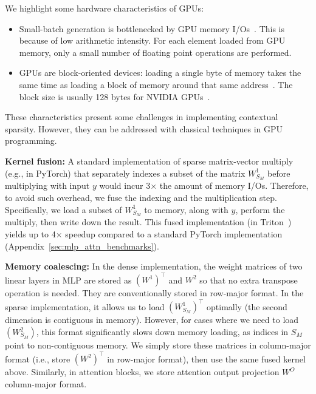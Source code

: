 We highlight some hardware characteristics of GPUs:
\begin{itemize}[itemsep=0.0pt,topsep=0pt,leftmargin=*]
  \item Small-batch generation is bottlenecked by GPU memory I/Os~\citep{nvidia2022nvidia, ivanov2021data, dao2022flashattention}. This is
  because of low arithmetic intensity. For each element loaded from GPU memory,
  only a small number of floating point operations are performed.
  \item GPUs are block-oriented devices: loading a single byte of memory takes
  the same time as loading a block of memory around that same
  address~\cite{harris2013access}. The block size is
  usually 128 bytes for NVIDIA GPUs~\citep{cook2012cuda}.
\end{itemize}
These characteristics present some challenges in implementing contextual
sparsity.
However, they can be addressed with classical techniques in GPU programming.

\textbf{Kernel fusion:} A standard implementation of sparse matrix-vector
  multiply (e.g., in PyTorch) that separately indexes a subset of the matrix
  $W^1_{S_M}$ before multiplying with input $y$ would incur 3$\times$ the
  amount of memory I/Os. Therefore, to avoid such overhead, we fuse the indexing and the multiplication step. Specifically, we load a subset of
  $W^1_{S_M}$ to memory, along with $y$, perform the multiply, then
  write down the result.
  This fused implementation (in Triton~\citep{tillet2019triton}) yields up to
  4$\times$ speedup compared to a standard PyTorch implementation (Appendix~\ref{sec:mlp_attn_benchmarks}).
  
\textbf{Memory coalescing:} In the dense implementation, the weight matrices of two linear layers in MLP are stored as $(W^1)^\top$ and $W^2$ so that no extra transpose operation is needed. They are conventionally stored in row-major format. In the sparse implementation, it allows us to load $(W^1_{S_M})^\top$ optimally (the second dimension is contiguous in memory). However, for cases where we need to load $(W^2_{S_M})$, this format significantly slows down memory loading, as indices in $S_M$ point to non-contiguous memory. We simply store these matrices in column-major format (i.e., store $(W^2)^\top$ in row-major format), then use the same fused kernel above. Similarly, in attention blocks, we store attention output projection $W^O$ column-major format.

